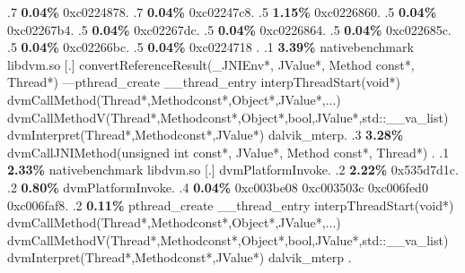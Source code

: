 \begin{profile}
{.7 \textbf{0.04\%} 0xc0224878. 
.7 \textbf{0.04\%} 0xc02247c8. 
.5 \textbf{1.15\%} 0xc0226860. 
.5 \textbf{0.04\%} 0xc02267b4. 
.5 \textbf{0.04\%} 0xc02267dc. 
.5 \textbf{0.04\%} 0xc0226864. 
.5 \textbf{0.04\%} 0xc022685c. 
.5 \textbf{0.04\%} 0xc02266bc. 
.5 \textbf{0.04\%} 0xc0224718\newline {} . 
.1 \textbf{ 3.39\%} nativebenchmark  libdvm.so              [.] convertReferenceResult(\_JNIEnv*, JValue*, Method const*, Thread*)\newline {} ---pthread\_create\newline {} \_\_thread\_entry\newline {} interpThreadStart(void*)\newline {} dvmCallMethod(Thread*,Methodconst*,Object*,JValue*,...)\newline {} dvmCallMethodV(Thread*,Methodconst*,Object*,bool,JValue*,std::\_\_va\_list)\newline {} dvmInterpret(Thread*,Methodconst*,JValue*)\newline {} dalvik\_mterp. 
.3 \textbf{3.28\%} dvmCallJNIMethod(unsigned int const*, JValue*, Method const*, Thread*)\newline {} . 
.1 \textbf{ 2.33\%} nativebenchmark  libdvm.so              [.] dvmPlatformInvoke. 
.2 \textbf{2.22\%} 0x535d7d1c. 
.2 \textbf{0.80\%} dvmPlatformInvoke. 
.4 \textbf{0.04\%} 0xc003be08\newline {} 0xc003503c\newline {} 0xc006fed0\newline {} 0xc006faf8. 
.2 \textbf{0.11\%} pthread\_create\newline {} \_\_thread\_entry\newline {} interpThreadStart(void*)\newline {} dvmCallMethod(Thread*,Methodconst*,Object*,JValue*,...)\newline {} dvmCallMethodV(Thread*,Methodconst*,Object*,bool,JValue*,std::\_\_va\_list)\newline {} dvmInterpret(Thread*,Methodconst*,JValue*)\newline {} dalvik\_mterp\newline {} . 
}
\end{profile}
